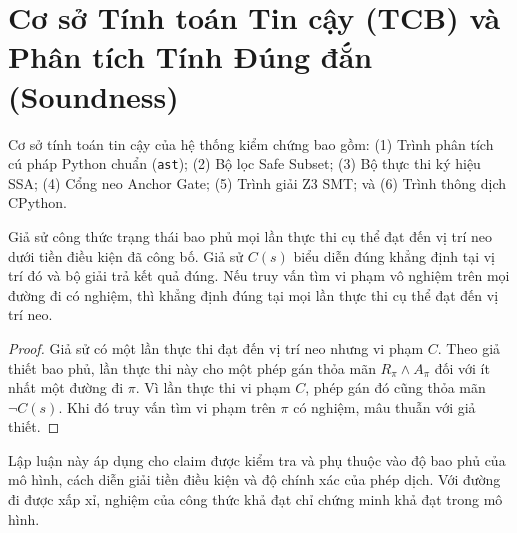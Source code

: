 \section{Cơ sở Tính toán Tin cậy (TCB) và Phân tích Tính Đúng đắn (Soundness)}
\label{sec:tcb_soundness}

\begin{definition}
Cơ sở tính toán tin cậy của hệ thống kiểm chứng bao gồm: (1) Trình phân tích cú pháp Python chuẩn (\texttt{ast}); (2) Bộ lọc Safe Subset; (3) Bộ thực thi ký hiệu SSA; (4) Cổng neo Anchor Gate; (5) Trình giải Z3 SMT; và (6) Trình thông dịch CPython.
\end{definition}

\begin{theorem}
Giả sử công thức trạng thái bao phủ mọi lần thực thi cụ thể đạt đến vị trí neo dưới tiền điều kiện đã công bố. Giả sử $C(s)$ biểu diễn đúng khẳng định tại vị trí đó và bộ giải trả kết quả đúng. Nếu truy vấn tìm vi phạm vô nghiệm trên mọi đường đi có nghiệm, thì khẳng định đúng tại mọi lần thực thi cụ thể đạt đến vị trí neo.
\end{theorem}

\begin{proof}
Giả sử có một lần thực thi đạt đến vị trí neo nhưng vi phạm $C$. Theo giả thiết bao phủ, lần thực thi này cho một phép gán thỏa mãn $R_\pi \land A_\pi$ đối với ít nhất một đường đi $\pi$. Vì lần thực thi vi phạm $C$, phép gán đó cũng thỏa mãn $\neg C(s)$. Khi đó truy vấn tìm vi phạm trên $\pi$ có nghiệm, mâu thuẫn với giả thiết.
\end{proof}

Lập luận này áp dụng cho claim được kiểm tra và phụ thuộc vào độ bao phủ của mô hình, cách diễn giải tiền điều kiện và độ chính xác của phép dịch. Với đường đi được xấp xỉ, nghiệm của công thức khả đạt chỉ chứng minh khả đạt trong mô hình.
